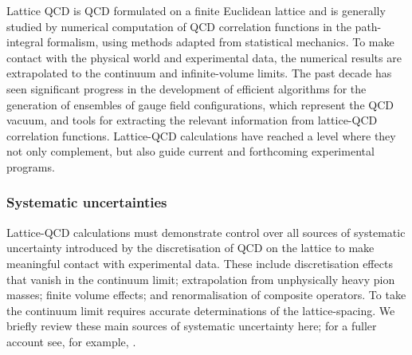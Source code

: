 Lattice QCD is QCD formulated on a finite Euclidean lattice and is generally
studied by numerical computation of QCD correlation functions in the
path-integral formalism, using methods adapted from statistical
mechanics. To make contact with the physical world and experimental
data, the numerical results are extrapolated to the continuum 
and infinite-volume limits. The past decade has seen significant progress in
the development of efficient algorithms for the generation of
ensembles of gauge field configurations, which represent the QCD
vacuum, and tools for extracting the relevant information from lattice-QCD
correlation functions. Lattice-QCD calculations have reached a level where
they not only complement, but also guide current and forthcoming
experimental programs.

\subsubsection{Systematic uncertainties}
Lattice-QCD calculations must demonstrate control over all sources of
systematic uncertainty introduced by the discretisation of QCD on the
lattice to make meaningful contact with experimental data. These
include discretisation effects that vanish in the continuum limit;
extrapolation from unphysically heavy pion masses; finite volume
effects; and renormalisation of composite operators. To take the 
continuum limit requires accurate determinations of the lattice-spacing. 
We briefly review these main sources of systematic
uncertainty here; for a fuller account see, for
example, \cite{Aoki:2016frl}.

